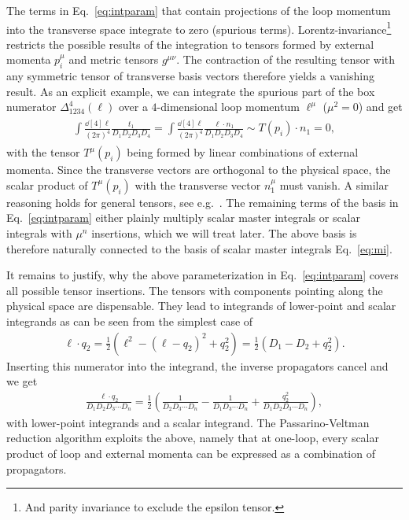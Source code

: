 The terms in Eq.~\eqref{eq:intparam} that contain
projections of the loop momentum into the transverse space integrate
to zero (spurious terms). Lorentz-invariance\footnote{And parity invariance to
  exclude the epsilon tensor.} restricts the possible results of the
integration to tensors formed by external momenta $p_i^\mu$ and metric tensors
$g^{\mu\nu}$. The contraction of the resulting tensor with any
symmetric tensor of transverse basis vectors therefore yields a vanishing result. As an explicit example, we can integrate the
spurious part of the box numerator $\Delta^4_{1234}(\ell)$ over a $4$-dimensional loop momentum $\ell^\mu$ ($\mu^2=0$) and get
\begin{align}
\begin{split}
  \int\frac{\dd[4]{\ell}}{(2\pi)^{4}}\frac{t_1}{D_1D_2D_3D_4}=\int\frac{\dd[4]{\ell}}{(2\pi)^{4}}\frac{\ell\cdot
    n_1}{D_1D_2D_3D_4}\sim T(p_i)\cdot n_{1}=0,
\end{split}
\end{align}
with the tensor $T^\mu(p_i)$ being formed by linear combinations of external
momenta. Since the transverse vectors are orthogonal to the physical
space, the scalar product of $T^\mu(p_i)$ with the transverse
vector $n_1^\mu$ must vanish. A similar reasoning holds for general
tensors, see e.g.~\cite{Ita:2011hi}. The remaining terms of the basis
in Eq.~\eqref{eq:intparam} either plainly multiply scalar master
integrals or scalar integrals with $\mu^n$ insertions, which we will treat later. The above basis is therefore naturally
connected to the basis of scalar master integrals Eq.~\eqref{eq:mi}. 

 

It remains to justify, why the above parameterization in
Eq.~\eqref{eq:intparam} covers all possible tensor insertions. The
tensors with components pointing along the physical space are
dispensable. They lead to integrands of lower-point and scalar
integrands as can be seen from the simplest case of 
\begin{align}
  \ell\cdot q_2 = \frac{1}{2}\left(\ell^2-(\ell-q_2)^2+q_2^2\right)=\frac{1}{2}\left(D_1-D_2+q_2^2\right).
\end{align}
Inserting this numerator into the integrand, the inverse propagators
cancel and we get
\begin{align}\label{eq:physdir}
  \frac{\ell\cdot q_2}{D_1D_2D_3\cdots D_n} = \frac{1}{2}\left(\frac{1}{D_2D_3\cdots D_n}-\frac{1}{D_1D_3\cdots D_n}+\frac{q_2^2}{D_1D_2D_3\cdots D_n}\right),
\end{align}
with lower-point integrands and a scalar integrand. The
Passarino-Veltman reduction algorithm \cite{Passarino:1978jh} exploits
the above, namely that at one-loop, every scalar product of loop and
external momenta can be expressed as a combination of propagators. 


